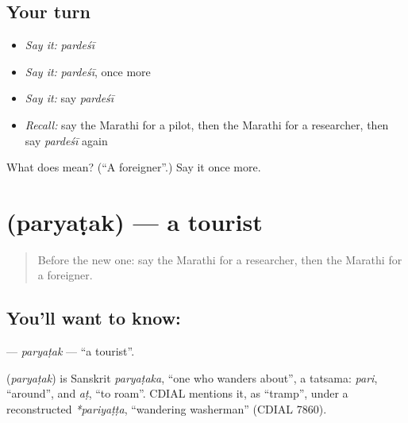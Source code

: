 \subsection*{Your turn}
\begin{itemize}
\raggedright
  \item \emph{Say it:} \emph{pardeśī}
  \item \emph{Say it:} \emph{pardeśī}, once more
  \item \emph{Say it:} say \emph{pardeśī}
  \item \emph{Recall:} say the Marathi for a pilot, then the Marathi for a researcher, then say \emph{pardeśī} again
\end{itemize}

\begin{tcolorbox}[breakable,colback=teal!4,colframe=teal!35!black,title={Before you move on}]
What does  mean? (\textquotedblleft{}A foreigner\textquotedblright{}.) Say it once more.
\end{tcolorbox}
\section[\texorpdfstring{\mr{पर्यटक} (paryaṭak)}{पर्यटक (paryaṭak)}]{ (paryaṭak) — a tourist}

\label{lesson:MR-C238-paryatak}



\begin{quote}
Before the new one: say the Marathi for a researcher, then the Marathi for a foreigner.
\end{quote}

\subsection*{You'll want to know: }
\textbf{} — \emph{paryaṭak} — \textquotedblleft{}a tourist\textquotedblright{}.

\begin{cousinweb}
\textbf{} (\emph{paryaṭak}) is Sanskrit \emph{paryaṭaka}, \textquotedblleft{}one who wanders about\textquotedblright{}, a tatsama: \emph{pari}, \textquotedblleft{}around\textquotedblright{}, and \emph{aṭ}, \textquotedblleft{}to roam\textquotedblright{}. CDIAL mentions it, as \textquotedblleft{}tramp\textquotedblright{}, under a reconstructed \emph{*pariyaṭṭa}, \textquotedblleft{}wandering washerman\textquotedblright{} (CDIAL 7860).
\end{cousinweb}

